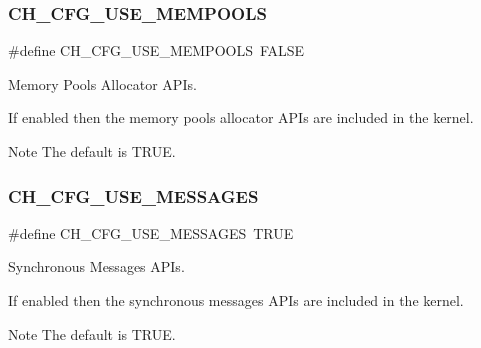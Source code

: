 \subsubsection{\texorpdfstring{C\+H\+\_\+\+C\+F\+G\+\_\+\+U\+S\+E\+\_\+\+M\+E\+M\+P\+O\+O\+LS}{CH\_CFG\_USE\_MEMPOOLS}}
{\footnotesize\ttfamily \#define C\+H\+\_\+\+C\+F\+G\+\_\+\+U\+S\+E\+\_\+\+M\+E\+M\+P\+O\+O\+LS~F\+A\+L\+SE}



Memory Pools Allocator A\+P\+Is. 

If enabled then the memory pools allocator A\+P\+Is are included in the kernel.

\begin{DoxyNote}{Note}
The default is {\ttfamily T\+R\+UE}. 
\end{DoxyNote}
\hypertarget{group__config_ga10585bbb78d4b11d82814f38181e5a3a}{}\label{group__config_ga10585bbb78d4b11d82814f38181e5a3a} 
\subsubsection{\texorpdfstring{C\+H\+\_\+\+C\+F\+G\+\_\+\+U\+S\+E\+\_\+\+M\+E\+S\+S\+A\+G\+ES}{CH\_CFG\_USE\_MESSAGES}}
{\footnotesize\ttfamily \#define C\+H\+\_\+\+C\+F\+G\+\_\+\+U\+S\+E\+\_\+\+M\+E\+S\+S\+A\+G\+ES~T\+R\+UE}



Synchronous Messages A\+P\+Is. 

If enabled then the synchronous messages A\+P\+Is are included in the kernel.

\begin{DoxyNote}{Note}
The default is {\ttfamily T\+R\+UE}. 
\end{DoxyNote}
\hypertarget{group__config_gaa65eccee8e56f16bccf3709c23f7ac57}{}\label{group__config_gaa65eccee8e56f16bccf3709c23f7ac57} 
